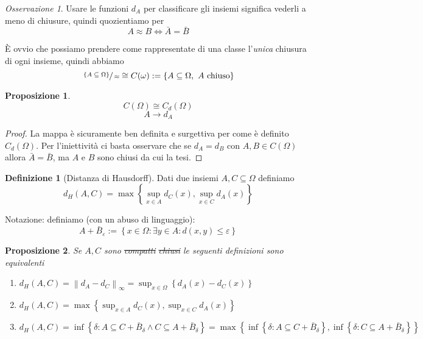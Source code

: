 \documentclass[a4paper,10pt]{article}
\theoremstyle{plain}
\newtheorem{mypro}{Proposizione}[section]
\theoremstyle{definition}
\newtheorem{mydef}{Definizione}[section]
\theoremstyle{remark}
\newtheorem{myoss}{Osservazione}[section]
\newcommand{\set}[1]{\left\{#1\right\}}
\newcommand{\norm}[1]{\left\|#1\right\|}
\begin{document}
\begin{myoss}
  Usare le funzioni $d_A$ per classificare gli insiemi significa
  vederli a meno di chiusure, quindi quozientiamo per
  \[ A \approx B \Leftrightarrow \bar A = \bar B \] 

  È ovvio che possiamo prendere come rappresentate di una classe
  l'\textit{unica} chiusura di ogni insieme, quindi abbiamo
  \[ \sfrac{\set{A \subseteq \Omega}}{\approx} \cong C(\omega) := \set{A
    \subseteq \Omega,\ A\text{ chiuso}} \]
\end{myoss}
\begin{mypro}
  \[ C(\Omega) \cong C_d(\Omega) \]
  \[ A \rightarrow d_A \]
\end{mypro}
\begin{proof}
  La mappa è sicuramente ben definita e surgettiva per come è definito
  $C_d(\Omega)$. Per l'iniettività ci basta osservare che se $d_A =
  d_B$ con $A,B \in C(\Omega)$ allora $\bar A = \bar B$, ma $A$ e $B$
  sono chiusi da cui la tesi.
\end{proof}



\begin{mydef}[Distanza di Hausdorff]
  Dati due insiemi $A,C \subseteq \Omega$ definiamo
%
  \[ d_H(A,C) = \max \set{\sup _{x\in A} d_C (x) , \sup _{x\in C} d_A
    (x) } \]
\end{mydef}

Notazione: definiamo (con un abuso di linguaggio):
\[ A + \bar B_\varepsilon := \set{ x \in \Omega : \exists y \in A :
  d(x,y) \le \varepsilon }\]

\begin{mypro}
  Se $A, C$ sono \sout{compatti} \sout{chiusi} le seguenti definizioni
  sono equivalenti
  \begin{enumerate}
  \item $ d_H (A,C) = \norm{ d_A - d_C } _\infty = \sup _{x\in \Omega}
    \set {d_A(x) - d_C(x)}$
  \item $d_H(A,C) = \max \set{\sup _{x\in A} d_C (x) , \sup _{x\in C}
      d_A (x) }$
  \item $d_H (A,C) = \inf \set{\delta : A \subseteq C + \bar B
    _\delta \wedge C \subseteq A + \bar B_\delta} = \max \set{\inf
    \set{\delta : A \subseteq C + \bar B _\delta }, \inf \set{\delta : C
      \subseteq A + \bar B _\delta }}  $
  \end{enumerate}
\end{mypro}
\end{document}
